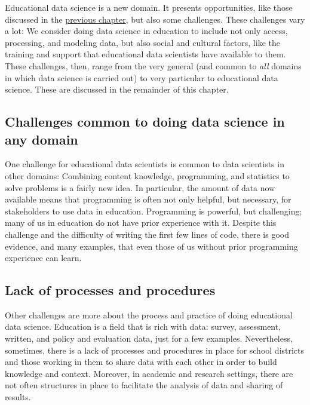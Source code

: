 \documentclass[]{book}
\begin{document}
Educational data science is a new domain. It presents opportunities,
like those discussed in the \protect\hyperlink{03-ds-role.Rmd}{previous
chapter}, but also some challenges. These challenges vary a lot: We
consider doing data science in education to include not only access,
processing, and modeling data, but also social and cultural factors,
like the training and support that educational data scientists have
available to them. These challenges, then, range from the very general
(and common to \emph{all} domains in which data science is carried out)
to very particular to educational data science. These are discussed in
the remainder of this chapter.

\subsection{Challenges common to doing data science in any
domain}\label{challenges-common-to-doing-data-science-in-any-domain}

One challenge for educational data scientists is common to data
scientists in other domains: Combining content knowledge, programming,
and statistics to solve problems is a fairly new idea. In particular,
the amount of data now available means that programming is often not
only helpful, but necessary, for stakeholders to use data in education.
Programming is powerful, but challenging; many of us in education do not
have prior experience with it. Despite this challenge and the difficulty
of writing the first few lines of code, there is good evidence, and many
examples, that even those of us without prior programming experience can
learn.

\subsection{Lack of processes and
procedures}\label{lack-of-processes-and-procedures}

Other challenges are more about the process and practice of doing
educational data science. Education is a field that is rich with data:
survey, assessment, written, and policy and evaluation data, just for a
few examples. Nevertheless, sometimes, there is a lack of processes and
procedures in place for school districts and those working in them to
share data with each other in order to build knowledge and context.
Moreover, in academic and research settings, there are not often
structures in place to facilitate the analysis of data and sharing of
results.
\end{document}
